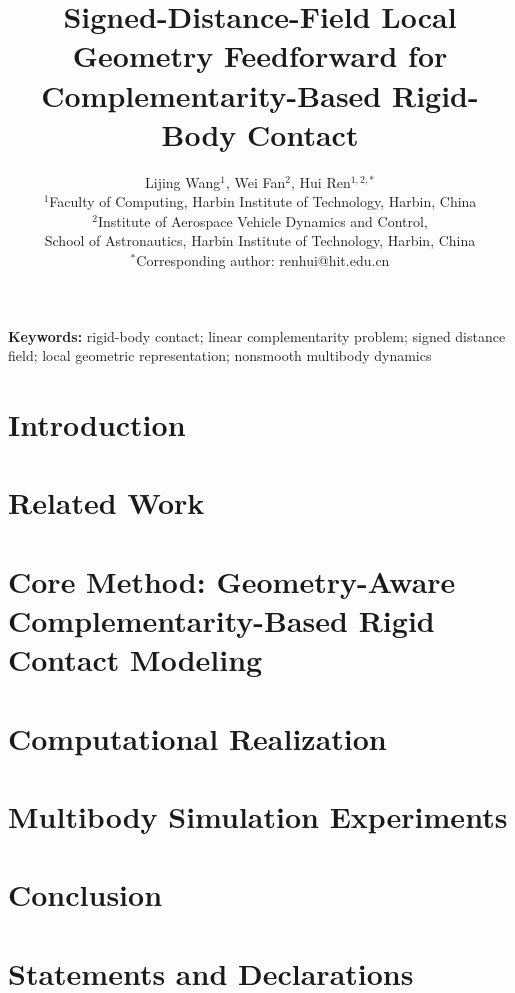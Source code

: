 \documentclass[12pt,a4paper]{article}
\title{\textbf{Signed-Distance-Field Local Geometry Feedforward for Complementarity-Based Rigid-Body Contact}}
\author{
    Lijing Wang$^1$, Wei Fan$^2$, Hui Ren$^{1,2,*}$\\[1em]
    $^1$Faculty of Computing, Harbin Institute of Technology, Harbin, China\\
    $^2$Institute of Aerospace Vehicle Dynamics and Control,\\
    School of Astronautics, Harbin Institute of Technology, Harbin, China\\[0.5em]
    $^*$Corresponding author: renhui@hit.edu.cn
}
\date{}
\begin{document}
\maketitle

\begin{abstract}

\end{abstract}
\noindent\textbf{Keywords:} rigid-body contact; linear complementarity problem; signed distance field; local geometric representation; nonsmooth multibody dynamics

\section{Introduction}


\section{Related Work}


\section{Core Method: Geometry-Aware Complementarity-Based Rigid Contact Modeling}


\section{Computational Realization}


\section{Multibody Simulation Experiments}


\section{Conclusion}


\section*{Statements and Declarations}




\end{document}
